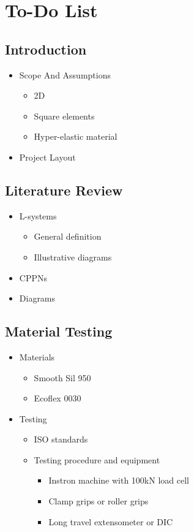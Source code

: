 \chapter{To-Do List}
\label{chp:TD}


\section{Introduction}

\begin{itemize}
	\item Scope And Assumptions
	\begin{itemize}
		\item 2D
		\item Square elements
		\item Hyper-elastic material
	\end{itemize}
	\item Project Layout
\end{itemize}

\section{Literature Review}

\begin{itemize}
	\item L-systems
	\begin{itemize}
		\item General definition
		\item Illustrative diagrams
	\end{itemize}
	\item CPPNs
	\item Diagrams
\end{itemize}


\section{Material Testing}

\begin{itemize}
	\item Materials
	\begin{itemize}
		\item Smooth Sil 950
		\item Ecoflex 0030
	\end{itemize}
	\item Testing
	\begin{itemize}
		\item ISO standards
		\item Testing procedure and equipment
		\begin{itemize}
			\item Instron machine with 100kN load cell
			\item Clamp grips or roller grips
			\item Long travel extensometer or DIC
		\end{itemize}
	\end{itemize}
\end{itemize}

